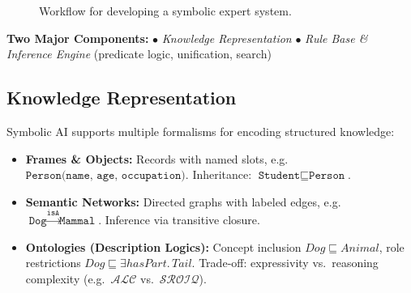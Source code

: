 \documentclass[12pt]{article}
\begin{document}
\begin{figure}[h!]
  \centering
  \caption{Workflow for developing a symbolic expert system.}
  \label{fig:expert-workflow}
\end{figure}

\colorbox{yellow!10}{%
  \parbox{\textwidth}{%
    \textbf{Two Major Components:}  
    \(\bullet\) \emph{Knowledge Representation}  
    \(\bullet\) \emph{Rule Base \& Inference Engine} (predicate logic, unification, search)
  }%
}

\subsection{Knowledge Representation}

Symbolic AI supports multiple formalisms for encoding structured knowledge:

\begin{itemize}
  \item \textbf{Frames \& Objects:}  
    Records with named slots, e.g.\ \(\texttt{Person(name, age, occupation)}\).  
    Inheritance: \(\texttt{Student}\sqsubseteq\texttt{Person}\).
  \item \textbf{Semantic Networks:}  
    Directed graphs with labeled edges, e.g.\ \(\texttt{Dog}\xrightarrow{\texttt{isA}}\texttt{Mammal}\).  
    Inference via transitive closure.
  \item \textbf{Ontologies (Description Logics):}  
    Concept inclusion \(Dog\sqsubseteq Animal\), role restrictions \(Dog\sqsubseteq \exists hasPart.\,Tail\).  
    Trade‐off: expressivity vs.\ reasoning complexity (e.g.\ \(\mathcal{ALC}\) vs.\ \(\mathcal{SROIQ}\)).
\end{itemize}
\end{document}
